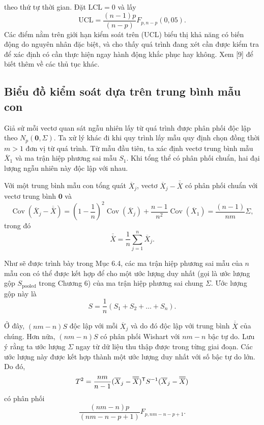 \noindent theo thứ tự thời gian. Đặt $\mathrm{LCL}=0$ và lấy
\begin{equation*}
    \mathrm{UCL} = \frac{(n-1)p}{(n-p)}F_{p,n-p}(0{,}05).
\end{equation*}
Các điểm nằm trên giới hạn kiểm soát trên (UCL) biểu thị khả năng có biến động do nguyên nhân đặc biệt, và cho thấy quá trình đang xét cần được kiểm tra để xác định có cần thực hiện ngay hành động khắc phục hay không. Xem [9] để biết thêm về các thủ tục khác.

\subsection*{\textbf{Biểu đồ kiểm soát dựa trên trung bình mẫu con}}

Giả sử mỗi vectơ quan sát ngẫu nhiên lấy từ quá trình được phân phối độc lập theo $N_{p}(\mathbf{0},\Sigma)$. Ta xử lý khác đi khi quy trình lấy mẫu quy định chọn đồng thời $m>1$ đơn vị từ quá trình. Từ mẫu đầu tiên, ta xác định vectơ trung bình mẫu $\overline{X}_{1}$ và ma trận hiệp phương sai mẫu $S_{1}$. Khi tổng thể có phân phối chuẩn, hai đại lượng ngẫu nhiên này độc lập với nhau.

Với một trung bình mẫu con tổng quát $\overline{X}_{j}$, vectơ $\overline{X}_{j} - \overline{\overline{X}}$ có phân phối chuẩn với vectơ trung bình $\mathbf{0}$ và
\begin{equation*}
    \operatorname{Cov}(\overline{X}_{j}-\overline{\overline{X}}) = \left(1-\frac{1}{n}\right)^{2}\operatorname{Cov}(\overline{X}_{j}) + \frac{n-1}{n^{2}}\operatorname{Cov}(\overline{X}_{1}) = \frac{(n-1)}{nm}\Sigma,
\end{equation*}
trong đó
\begin{equation*}
    \overline{\overline{X}} = \frac{1}{n}\sum_{j=1}^{n}\overline{X}_{j}.
\end{equation*}

Như sẽ được trình bày trong Mục 6.4, các ma trận hiệp phương sai mẫu của $n$ mẫu con có thể được kết hợp để cho một ước lượng duy nhất (gọi là ước lượng gộp $S_{\mathrm{pooled}}$ trong Chương 6) của ma trận hiệp phương sai chung $\Sigma$. Ước lượng gộp này là
\begin{equation*}
    S = \frac{1}{n}(S_{1} + S_{2} + \dots + S_{n}).
\end{equation*}

Ở đây, $(nm-n)S$ độc lập với mỗi $\overline{X}_{j}$ và do đó độc lập với trung bình $\overline{\overline{X}}$ của chúng. Hơn nữa, $(nm-n)S$ có phân phối Wishart với $nm-n$ bậc tự do. Lưu ý rằng ta ước lượng $\Sigma$ ngay từ dữ liệu thu thập được trong từng giai đoạn. Các ước lượng này được kết hợp thành một ước lượng duy nhất với số bậc tự do lớn. Do đó,
\begin{equation*}
    T^{2} = \frac{nm}{n-1}(\overline{X}_{j}-\overline{\overline{X}})^{\mathsf T} S^{-1}(\overline{X}_{j}-\overline{\overline{X}})
\end{equation*}
có phân phối
\begin{equation}
    \frac{(nm-n)p}{(nm-n-p+1)}F_{p, nm-n-p+1}.
    \tag{5-35}
    \label{eq:5-35}
\end{equation}

